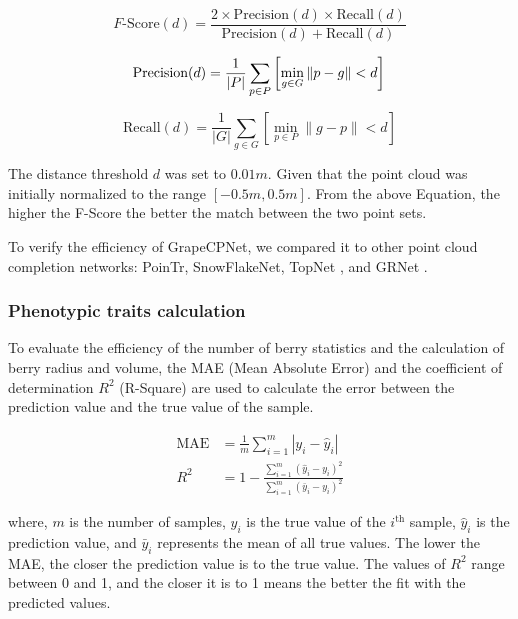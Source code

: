 \documentclass[12pt]{article}
\begin{document}
\begin{equation}
    F\text{-Score}(d) = \frac{2 \times \text{Precision}(d) \times \text{Recall}(d)}{\text{Precision}(d) + \text{Recall}(d)} 
\label{eq:9}
\end{equation}


\begin{equation}
    \text{Precision}(d) = \frac{1}{|P|} \sum_{p \in P} \left[ \min_{g \in G} \|p - g\| < d \right]\\
\label{eq:10}
\end{equation}

\begin{equation}
    \text{Recall}(d) = \frac{1}{|G|} \sum_{g \in G} \left[ \min_{p \in P} \|g - p\| < d \right]
\label{eq:11}
\end{equation}

{\raggedright The distance threshold $d$ was set to $0.01m$. Given that the point cloud was initially normalized to the range $[-0.5m, 0.5m]$. 
From the above Equation, the higher the F-Score the better the match between the two point sets.}

To verify the efficiency of GrapeCPNet, we compared it to other point cloud completion networks: PoinTr, SnowFlakeNet, TopNet \citep{tchapmi_topnet_2019}, and GRNet \citep{xie_grnet_2020}.

\subsubsection{Phenotypic traits calculation}
\label{sec:253}
To evaluate the efficiency of the number of berry statistics and the calculation of berry radius and volume, the MAE (Mean Absolute Error) and the coefficient of determination $R^2$ (R-Square) are used to calculate the error between the prediction value and the true value of the sample.

\begin{align}
    \text{MAE} &= \frac{1}{m} \sum_{i=1}^{m} |y_i - \hat{y}_i| \tag{12}\\
    R^2 &= 1 - \frac{\sum_{i=1}^{m} (\hat{y}_i - y_i)^2}{\sum_{i=1}^{m} (\bar{y}_i - y_i)^2} \tag{13}
\end{align}

{\raggedright where, $m$ is the number of samples, $y_i$ is the true value of the $i^{\text{th}}$ sample, $\hat{y}_i$ is the prediction value, and $\bar{y}_i$ represents the mean of all true values. 
The lower the MAE, the closer the prediction value is to the true value. The values of $R^2$ range between 0 and 1, and the closer it is to 1 means the better the fit with the predicted values.}
\end{document}
